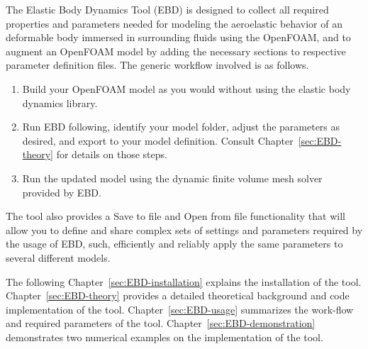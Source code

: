 
The Elastic Body Dynamics Tool (EBD) is designed to collect all required properties and parameters
needed for modeling the aeroelastic behavior of an deformable body immersed in surrounding fluids using the OpenFOAM, and to augment an OpenFOAM model by adding the necessary sections to respective parameter definition files. The generic workflow involved is as follows.

\begin{enumerate}
\item
   Build your OpenFOAM model as you would without using the elastic body dynamics library. 
   
\item
   Run EBD following, identify your model folder, adjust the parameters as desired, and export to your model definition. Consult Chapter~\ref{sec:EBD-theory} for details on those steps.
   
\item
    Run the updated model using the dynamic finite volume mesh solver provided by EBD.
    
\end{enumerate}

\noindent The tool also provides a Save to file and Open from file functionality that will allow you to
define and share complex sets of settings and parameters required by the usage of EBD, such, efficiently and reliably apply the same parameters to several different models.


The following Chapter~\ref{sec:EBD-installation} explains the installation of the tool. Chapter~\ref{sec:EBD-theory} provides a detailed theoretical background and code implementation of the tool.  Chapter~\ref{sec:EBD-usage} summarizes the work-flow and required parameters of the tool. Chapter~\ref{sec:EBD-demonstration} demonstrates two numerical examples on the implementation of the tool.